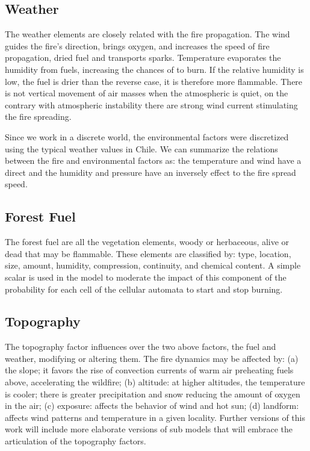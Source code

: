 \documentclass[conference]{IEEEtran}
\begin{document}
    
    \subsection{Weather}
        
      The weather elements are closely related with the fire propagation. The wind guides the fire’s direction, 
      brings oxygen, and increases the speed of fire propagation, dried fuel and transports sparks. Temperature 
      evaporates the humidity from fuels, increasing the chances of to burn. If the relative humidity is low, the 
      fuel is drier than the reverse case, it is therefore more flammable. There is not vertical movement of air 
      masses when the atmospheric is quiet, on the contrary with atmospheric instability there are strong wind 
      current stimulating the fire spreading. 
      
      Since we work in a discrete world, the environmental factors were discretized using the typical weather values 
      in Chile. We can summarize the relations between the fire and environmental factors as: the temperature and 
      wind have a direct and the humidity and pressure have an inversely effect to the fire spread speed. 

    
    \subsection{Forest Fuel}
    
      The forest fuel are all the vegetation elements, woody or herbaceous, alive or dead
      that may be flammable. These elements are classified by: type, location, size, amount,
      humidity, compression, continuity, and chemical content. A simple scalar
      is used in the model to moderate the impact of this component of the probability for each cell of
      the cellular automata to start and stop burning.
        
        
    \subsection{Topography}
    
      The topography factor influences over the two above factors, the fuel and weather,
      modifying or altering them. The fire dynamics may be affected by: (a) the slope; it
      favors the rise of convection currents of warm air preheating fuels above, accelerating
      the wildfire; (b) altitude: at higher altitudes, the temperature is cooler; there is greater
      precipitation and snow reducing the amount of oxygen in the air; (c) exposure: affects
      the behavior of wind and hot sun; (d) landform: affects wind patterns and temperature
      in a given locality. %
      Further versions of this work will include more elaborate versions of sub
      models that will embrace the articulation of the topography factors. 
\end{document}
